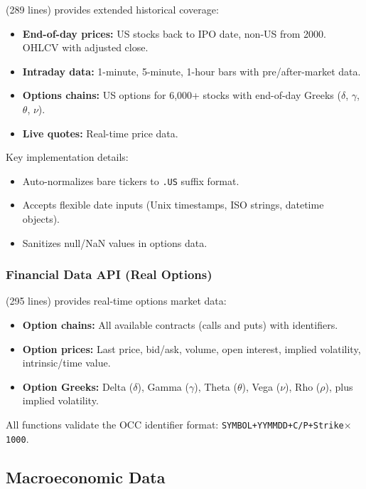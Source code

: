  (289 lines) provides extended historical coverage:

\begin{itemize}
  \item \textbf{End-of-day prices:} US stocks back to IPO date, non-US from 2000. OHLCV with adjusted close.
  \item \textbf{Intraday data:} 1-minute, 5-minute, 1-hour bars with pre/after-market data.
  \item \textbf{Options chains:} US options for 6,000+ stocks with end-of-day Greeks ($\delta$, $\gamma$, $\theta$, $\nu$).
  \item \textbf{Live quotes:} Real-time price data.
\end{itemize}

Key implementation details:
\begin{itemize}
  \item Auto-normalizes bare tickers to \texttt{.US} suffix format.
  \item Accepts flexible date inputs (Unix timestamps, ISO strings, datetime objects).
  \item Sanitizes null/NaN values in options data.
\end{itemize}

\subsubsection{Financial Data API (Real Options)}

 (295 lines) provides real-time options market data:

\begin{itemize}
  \item \textbf{Option chains:} All available contracts (calls and puts) with identifiers.
  \item \textbf{Option prices:} Last price, bid/ask, volume, open interest, implied volatility, intrinsic/time value.
  \item \textbf{Option Greeks:} Delta ($\delta$), Gamma ($\gamma$), Theta ($\theta$), Vega ($\nu$), Rho ($\rho$), plus implied volatility.
\end{itemize}

All functions validate the OCC identifier format: \texttt{SYMBOL+YYMMDD+C/P+Strike$\times$1000}.

\subsection{Macroeconomic Data}

